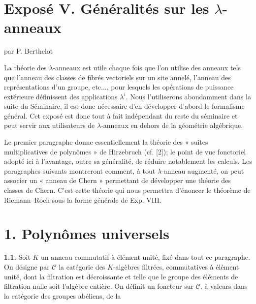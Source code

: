 \section*{Exposé V. Généralités sur les \(\lambda\)-anneaux}
\begin{center}
par P. Berthelot
\end{center}

La théorie des \(\lambda\)-anneaux est utile chaque fois que l'on utilise des anneaux tels que l'anneau des classes de fibrés vectoriels sur un site annelé, l'anneau des représentations d'un groupe, etc..., pour lesquels les opérations de puissance extérieure définissent des applications \(\lambda^i\). Nous l'utiliserons abondamment dans la suite du Séminaire, il est donc nécessaire d'en développer d'abord le formalisme général. Cet exposé est donc tout à fait indépendant du reste du séminaire et peut servir aux utilisateurs de \(\lambda\)-anneaux en dehors de la géométrie algébrique.

Le premier paragraphe donne essentiellement la théorie des « suites multiplicatives de polynômes » de Hirzebruch (cf. [2]); le point de vue fonctoriel adopté ici à l'avantage, outre sa généralité, de réduire notablement les calculs. Les paragraphes suivants montreront comment, à tout \(\lambda\)-anneau augmenté, on peut associer un « anneau de Chern » permettant de développer une théorie des classes de Chern. C'est cette théorie qui nous permettra d'énoncer le théorème de Riemann--Roch sous la forme générale de Exp. VIII.

\section*{1. Polynômes universels}

\textbf{1.1.} Soit \(K\) un anneau commutatif à élément unité, fixé dans tout ce paragraphe. On désigne par \(\mathcal C\) la catégorie des \(K\)-algèbres filtrées, commutatives à élément unité, dont la filtration est décroissante et telle que le groupe des éléments de filtration nulle soit l'algèbre entière. On définit un foncteur sur \(\mathcal C\), à valeurs dans la catégorie des groupes abéliens, de la
